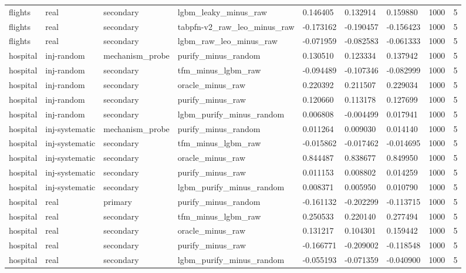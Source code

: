 \begin{tabular}{lllllllll}
flights & real & secondary & lgbm\_leaky\_minus\_raw & 0.146405 & 0.132914 & 0.159880 & 1000 & 5 \\
flights & real & secondary & tabpfn-v2\_raw\_leo\_minus\_raw & -0.173162 & -0.190457 & -0.156423 & 1000 & 5 \\
flights & real & secondary & lgbm\_raw\_leo\_minus\_raw & -0.071959 & -0.082583 & -0.061333 & 1000 & 5 \\
hospital & inj-random & mechanism\_probe & purify\_minus\_random & 0.130510 & 0.123334 & 0.137942 & 1000 & 5 \\
hospital & inj-random & secondary & tfm\_minus\_lgbm\_raw & -0.094489 & -0.107346 & -0.082999 & 1000 & 5 \\
hospital & inj-random & secondary & oracle\_minus\_raw & 0.220392 & 0.211507 & 0.229034 & 1000 & 5 \\
hospital & inj-random & secondary & purify\_minus\_raw & 0.120660 & 0.113178 & 0.127699 & 1000 & 5 \\
hospital & inj-random & secondary & lgbm\_purify\_minus\_random & 0.006808 & -0.004499 & 0.017941 & 1000 & 5 \\
hospital & inj-systematic & mechanism\_probe & purify\_minus\_random & 0.011264 & 0.009030 & 0.014140 & 1000 & 5 \\
hospital & inj-systematic & secondary & tfm\_minus\_lgbm\_raw & -0.015862 & -0.017462 & -0.014695 & 1000 & 5 \\
hospital & inj-systematic & secondary & oracle\_minus\_raw & 0.844487 & 0.838677 & 0.849950 & 1000 & 5 \\
hospital & inj-systematic & secondary & purify\_minus\_raw & 0.011153 & 0.008802 & 0.014259 & 1000 & 5 \\
hospital & inj-systematic & secondary & lgbm\_purify\_minus\_random & 0.008371 & 0.005950 & 0.010790 & 1000 & 5 \\
hospital & real & primary & purify\_minus\_random & -0.161132 & -0.202299 & -0.113715 & 1000 & 5 \\
hospital & real & secondary & tfm\_minus\_lgbm\_raw & 0.250533 & 0.220140 & 0.277494 & 1000 & 5 \\
hospital & real & secondary & oracle\_minus\_raw & 0.131217 & 0.104301 & 0.159442 & 1000 & 5 \\
hospital & real & secondary & purify\_minus\_raw & -0.166771 & -0.209002 & -0.118548 & 1000 & 5 \\
hospital & real & secondary & lgbm\_purify\_minus\_random & -0.055193 & -0.071359 & -0.040900 & 1000 & 5 \\

\end{tabular}
